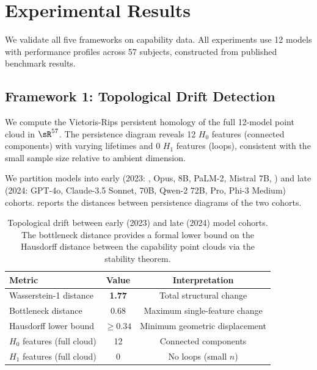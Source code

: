 \section{Experimental Results}
\label{sec:results}

We validate all five frameworks on \mmlu capability data.
All experiments use 12 models with performance profiles across 57 subjects, constructed from published benchmark results.

\subsection{Framework 1: Topological Drift Detection}

We compute the Vietoris-Rips persistent homology of the full 12-model point cloud in $\sR^{57}$.
The persistence diagram reveals 12 $H_0$ features (connected components) with varying lifetimes and 0 $H_1$ features (loops), consistent with the small sample size relative to ambient dimension.

We partition models into early (2023: \gpt, \claude Opus, \llama 8B, PaLM-2, Mistral 7B, \mixtral) and late (2024: GPT-4o, Claude-3.5 Sonnet, \llama 70B, Qwen-2 72B,  Pro, Phi-3 Medium) cohorts.
 reports the distances between persistence diagrams of the two cohorts.

\begin{table}[t]
    \centering
    \caption{Topological drift between early (2023) and late (2024) model cohorts. The bottleneck distance provides a formal lower bound on the Hausdorff distance between the capability point clouds via the stability theorem.}
    \begin{tabular}{@{}lcc@{}}
        \toprule
        Metric & Value & Interpretation \\
        \midrule
        Wasserstein-1 distance & \textbf{1.77} & Total structural change \\
        Bottleneck distance & 0.68 & Maximum single-feature change \\
        Hausdorff lower bound & $\geq 0.34$ & Minimum geometric displacement \\
        $H_0$ features (full cloud) & 12 & Connected components \\
        $H_1$ features (full cloud) & 0 & No loops (small $n$) \\
        \bottomrule
    \end{tabular}
    \label{tab:drift}
\end{table}

